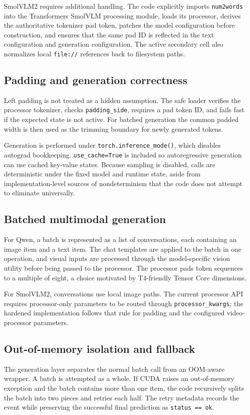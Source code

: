 \documentclass[11pt,a4paper]{article}
\newcommand{\code}[1]{\texttt{#1}}
\begin{document}
SmolVLM2 requires additional handling. The code explicitly imports \code{num2words} into the Transformers SmolVLM processing module, loads its processor, derives the authoritative tokenizer pad token, patches the model configuration before construction, and ensures that the same pad ID is reflected in the text configuration and generation configuration. The active secondary cell also normalizes local \code{file://} references back to filesystem paths.

\subsection{Padding and generation correctness}
Left padding is not treated as a hidden assumption. The safe loader verifies the processor tokenizer, checks \code{padding\_side}, requires a pad token ID, and fails fast if the expected state is not active. For batched generation the common padded width is then used as the trimming boundary for newly generated tokens.

Generation is performed under \code{torch.inference\_mode()}, which disables autograd bookkeeping. \code{use\_cache=True} is included so autoregressive generation can use cached key-value states. Because sampling is disabled, calls are deterministic under the fixed model and runtime state, aside from implementation-level sources of nondeterminism that the code does not attempt to eliminate universally.

\subsection{Batched multimodal generation}
For Qwen, a batch is represented as a list of conversations, each containing an image item and a text item. The chat templates are applied to the batch in one operation, and visual inputs are processed through the model-specific vision utility before being passed to the processor. The processor pads token sequences to a multiple of eight, a choice motivated by T4-friendly Tensor Core dimensions.

For SmolVLM2, conversations use local image paths. The current processor API requires processor-only parameters to be routed through \code{processor\_kwargs}; the hardened implementation follows that rule for padding and the configured video-processor parameters.

\subsection{Out-of-memory isolation and fallback}
The generation layer separates the normal batch call from an OOM-aware wrapper. A batch is attempted as a whole. If CUDA raises an out-of-memory exception and the batch contains more than one item, the code recursively splits the batch into two pieces and retries each half. The retry metadata records the event while preserving the successful final prediction as \code{status == ok}.
\end{document}
